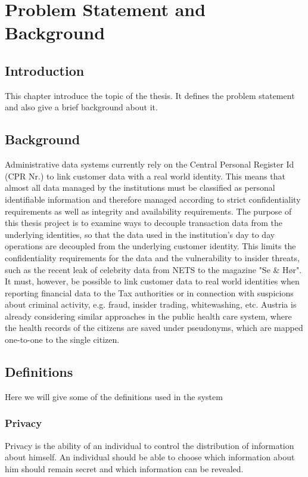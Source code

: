 \chapter{Problem Statement and Background}

\section{Introduction}
This chapter introduce the topic of the thesis. It defines the problem statement and also give a brief background about it.
\section{Background}
Administrative data systems currently rely on the Central Personal Register Id (CPR Nr.) to link customer data with a real world identity. This means that almost all data managed by the institutions must be classified as personal identifiable information and therefore managed according to strict confidentiality requirements as well as integrity and availability requirements. The purpose of this thesis project is to examine ways to decouple transaction data from the underlying identities, so that the data used in the institution's day to day operations are decoupled from the underlying customer identity. This limits the confidentiality requirements for the data and the vulnerability to insider threats, such as the recent leak of celebrity data from NETS to the magazine "Se \& Hør". It must, however, be possible to link customer data to real world identities when reporting financial data to the Tax authorities or in connection with suspicions about criminal activity, e.g. fraud, insider trading, whitewashing, etc. Austria is already considering similar approaches in the public health care system, where the health records of the citizens are saved under pseudonyms, which are mapped one-to-one to the single citizen.
\section{Definitions}
Here we will give some of the definitions used in the system
\subsection{Privacy}
Privacy is the ability of an individual to control the distribution of information about himself. An individual should be able to choose which information about him should remain secret and which information can be revealed.
